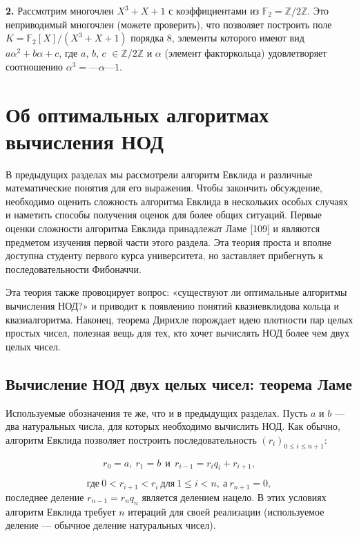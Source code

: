 \documentclass{mai_book}
\begin{document}
\textbf{2.}  Рассмотрим многочлен $X^3 + X + 1$ с коэффициентами из 
$\mathbb{F}_2 = \mathbb{Z}\slash 2\mathbb{Z}$. Это неприводимый многочлен (можете проверить), что  
позволяет построить поле $K = \mathbb{F}_2[X]\slash(X^3 + X + 1)$ порядка 8, элементы 
которого имеют вид $a\alpha^2 + b\alpha + c$, где $a$, $b$, $c$ $\in \mathbb{Z}/2\mathbb{Z}$ и $\alpha$ (элемент 
факторкольца) удовлетворяет соотношению $\alpha^3 = —\alpha — 1$.

\section{ Об оптимальных алгоритмах вычисления НОД}
В предыдущих разделах мы рассмотрели алгоритм Евклида и  
различные математические понятия для его выражения. Чтобы закончить 
обсуждение, необходимо оценить сложность алгоритма Евклида в  
нескольких особых случаях и наметить способы получения оценок для 
более общих ситуаций. Первые оценки сложности алгоритма Евклида 
принадлежат Ламе [109] и являются предметом изучения первой части 
этого раздела. Эта теория проста и вполне доступна студенту первого 
курса университета, но заставляет прибегнуть к последовательности 
Фибоначчи.
 
Эта теория также провоцирует вопрос: «существуют ли  
оптимальные алгоритмы вычисления НОД?» и приводит к появлению понятий 
квазиевклидова кольца и квазиалгоритма. Наконец, теорема Дирихле 
порождает идею плотности пар целых простых чисел, полезная вещь 
для тех, кто хочет вычислять НОД более чем двух целых чисел. 
 
\subsection{Вычисление НОД двух целых чисел: теорема Ламе}
Используемые обозначения те же, что и в предыдущих разделах. Пусть 
$a$ и $b$ — два натуральных числа, для которых необходимо вычислить 
НОД. Как обычно, алгоритм Евклида позволяет построить  
последовательность $(r_i)_{0 \leqslant i \leqslant n+1}$:

\begin{equation*}
r_0 = a,\: r_1 = b \:\: \text{и} \:\: r_{i-1} = r_i q_i + r_{i+1},
\end{equation*}
\newpage

\begin{equation*}
\text{где}\: 0 < r_{i+1} < r_i \: \text{для}\: 1 \leqslant i < n,\: \text{а}\: r_{n+1} = 0,
\end{equation*}
последнее деление $r_{n-1} = r_n q_n$ является делением нацело. В этих  
условиях алгоритм Евклида требует $n$ итераций для своей реализации 
(используемое деление — обычное деление натуральных чисел). 
\end{document}
